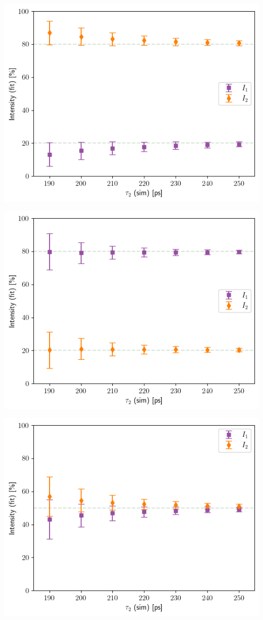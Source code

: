 \begin{minipage}{.5\linewidth}
    \centering
    \includegraphics[width=\linewidth]{Batch 3/regular IRF/tau1 150/output/plotfin/2080.png}
    \label{fig:150-2080}
\end{minipage}
\begin{minipage}{.5\linewidth}
    \centering
    \includegraphics[width=\linewidth]{Batch 3/regular IRF/tau1 150/output/plotfin/8020.png}
    \label{fig:150-8020}
\end{minipage}
\begin{minipage}{\linewidth}
    \centering
    \includegraphics[width=.5\linewidth]{Batch 3/regular IRF/tau1 150/output/plotfin/5050.png}
    \label{fig:150-5050}
\end{minipage}

